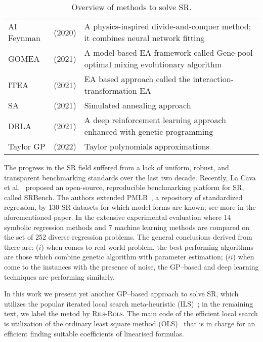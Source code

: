 \documentclass[a4paper,12pt]{elsarticle}
\begin{document}
\begin{table}[!ht]
{\begin{tabularx}{550pt}{l  l  X}
	       AI Feynman  & \cite{udrescu2020ai} (2020) & A physics-inspired divide-and-conquer method; it  combines neural network fitting \\
	             GOMEA  & \cite{virgolin2021improving} (2021)    & A model-based
	       EA framework called Gene-pool optimal mixing evolutionary algorithm \\
	       ITEA & \cite{de2021interaction} (2021)   & EA based approach called the interaction-transformation EA   \\
	       SA & \cite{kantor2021simulated} (2021) &  Simulated annealing approach \\
	       
         DRLA & \cite{mundhenk2021symbolic} (2021)  &    A deep reinforcement learning approach enhanced with genetic programming \\
            Taylor GP &  \cite{he2022taylor} (2022)  &  Taylor polynomials approximations  \\ \hline
         

	\end{tabularx} }
		\caption{Overview of methods to solve SR.}
		\label{tab:gp-based}
	\end{table}
 
  
	The progress in the SR field suffered from a lack of uniform, robust, and transparent
	benchmarking standards over the last two decade. Recently, La Cava et al.~\cite{la2021contemporary} proposed an
	open-source, reproducible benchmarking platform for SR, called SRBench. The authors extended  PMLB~\cite{olson2017pmlb},  a repository of standardized regression, by 130 SR datasets for which model forms are known; see more in the aforementioned paper. In the extensive experimental evaluation  where 14
	symbolic regression methods and 7 machine learning methods are compared on the  set of 252 diverse
    regression problems. The general conclusions derived from there are: ($i$) when comes to real-world problem, the best performing algorithms are those which combine genetic algorithm with parameter estimation; ($ii$) when come to the instances with the presence of noise, the GP--based and deep learning techniques are performing similarly. 
    
    In this work we present yet another GP--based approach to solve SR, which utilizes the popular iterated local search meta-heuristic (ILS)~\cite{lourencco2003iterated,lourencco2019iterated}; in the remaining text, we label the metod by \textsc{Rils-Rols}.  The main code of the efficient local search is utilization of the ordinary least square method (OLS)~\cite{leng2007ordinary} that is in charge for an efficient finding suitable coefficients of linearised formulas.  
 
\end{document}
